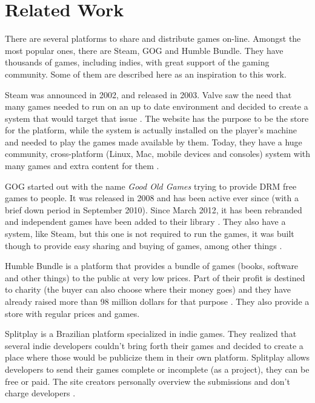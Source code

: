 \section{Related Work}
\label {sec:relate_work}

There are several platforms to share and distribute games on-line. Amongst the most popular ones, there are Steam, GOG and Humble Bundle. They have thousands of games, including indies, with great support of the gaming community. Some of them are described here as an inspiration to this work.

Steam was announced in 2002, and released in 2003. Valve saw the need that many games needed to run on an up to date environment and decided to create a system that would target that issue \cite{wikipedia2017steam}. The website has the purpose to be the store for the platform, while the system is actually installed on the player's machine and needed to play the games made available by them. Today, they have a huge community, cross-platform (Linux, Mac, mobile devices and consoles) system with many games and extra content for them \cite{steam2017}.

GOG started out with the name \textit{Good Old Games} trying to provide DRM free games to people. It was released in 2008 and has been active ever since (with a brief down period in September 2010). Since March 2012, it has been rebranded and independent games have been added to their library \cite{wikipedia2017gog}. They also have a system, like Steam, but this one is not required to run the games, it was built though to provide easy sharing and buying of games, among other things \cite{gog2017}.

Humble Bundle is a platform that provides a bundle of games (books, software and other things) to the public at very low prices. Part of their profit is destined to charity (the buyer can also choose where their money goes) and they have already raised more than 98 million dollars for that purpose \cite{humblebundle2017}. They also provide a store with regular prices and games.

Splitplay is a Brazilian platform specialized in indie games. They realized that several indie developers couldn't bring forth their games and decided to create a place where those would be publicize them in their own platform. Splitplay allows developers to send their games complete or incomplete (as a project), they can be free or paid. The site creators personally overview the submissions and don't charge developers \cite{splitplay2017}.
